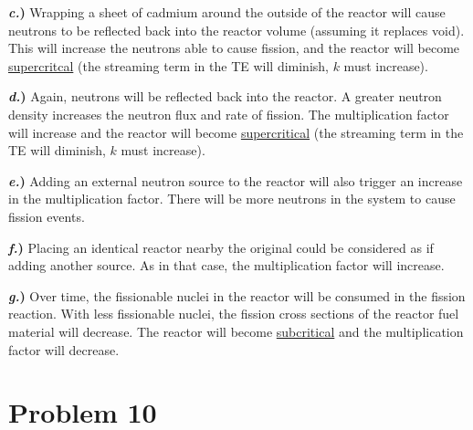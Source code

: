 \documentclass{article}
\begin{document}
\textbf{\textit{c.})} Wrapping a sheet of cadmium around the outside of the reactor will cause neutrons to be reflected back into the reactor volume (assuming it replaces void). This will increase the neutrons able to cause fission, and the reactor will become \underline{supercritcal}  (the streaming term in the TE will diminish, $k$ must increase).

\textbf{\textit{d.})} Again, neutrons will be reflected back into the reactor. A greater neutron density increases the neutron flux and rate of fission. The multiplication factor will increase and the reactor will become \underline{supercritical}  (the streaming term in the TE will diminish, $k$ must increase).

\textbf{\textit{e.})} Adding an external neutron source to the reactor will also trigger an increase in the multiplication factor. There will be more neutrons in the system to cause fission events.

\textbf{\textit{f.})} Placing an identical reactor nearby the original could be considered as if adding another source. As in that case, the multiplication factor will increase.

\textbf{\textit{g.})} Over time, the fissionable nuclei in the reactor will be consumed in the fission reaction. With less fissionable nuclei, the fission cross sections of the reactor fuel material will decrease. The reactor will become \underline{subcritical} and the multiplication factor will decrease.




\section*{Problem 10}
\end{document}

